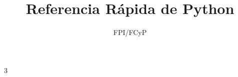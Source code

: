 \documentclass[10pt]{article}
\title{Referencia Rápida de Python}
\author{FPI/FCyP}
\begin{document}

\maketitle
\begin{multicols*}{3}

% 
% 
% 
% 


\end{multicols*}
\end{document}
